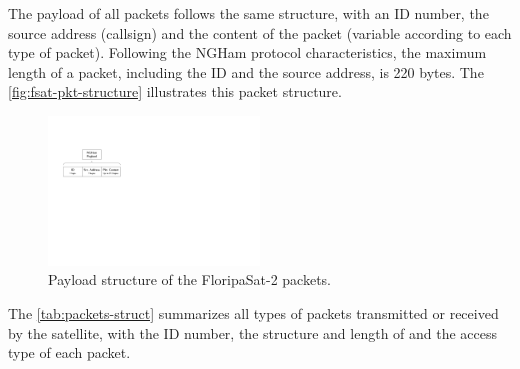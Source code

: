The payload of all packets follows the same structure, with an ID number, the source address (callsign) and the content of the packet (variable according to each type of packet). Following the NGHam protocol characteristics, the maximum length of a packet, including the ID and the source address, is 220 bytes. The \autoref{fig:fsat-pkt-structure} illustrates this packet structure.

\begin{figure}[!ht]
    \begin{center}
        \includegraphics[width=0.5\textwidth]{figures/floripasat-packet-structure.pdf}
        \caption{Payload structure of the FloripaSat-2 packets.}
        \label{fig:fsat-pkt-structure}
    \end{center}
\end{figure}

The \autoref{tab:packets-struct} summarizes all types of packets transmitted or received by the satellite, with the ID number, the structure and length of and the access type of each packet.

